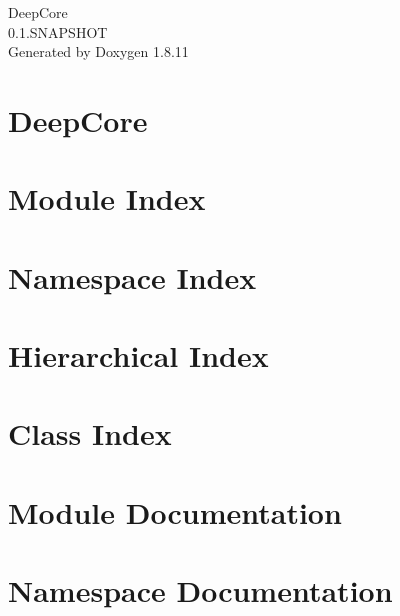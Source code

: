 \documentclass[twoside]{book}
\newcommand{\+}{\discretionary{\mbox{\scriptsize$\hookleftarrow$}}{}{}}
\newcommand{\clearemptydoublepage}{%
  \newpage{\pagestyle{empty}\cleardoublepage}%
}
\begin{document}
\hypersetup{pageanchor=false,
             bookmarksnumbered=true,
             pdfencoding=unicode
            }
\begin{titlepage}
\vspace*{7cm}
\begin{center}%
{\Large Deep\+Core \\[1ex]\large 0.\+1.\+S\+N\+A\+P\+S\+H\+OT }\\
\vspace*{1cm}
{\large Generated by Doxygen 1.8.11}\\
\end{center}
\end{titlepage}
\clearemptydoublepage
\tableofcontents
\clearemptydoublepage
{}
\hypersetup{pageanchor=true}

\chapter{Deep\+Core}
\label{index}\hypertarget{index}{}
\chapter{Module Index}

\chapter{Namespace Index}

\chapter{Hierarchical Index}

\chapter{Class Index}

\chapter{Module Documentation}





\chapter{Namespace Documentation}
















\end{document}
